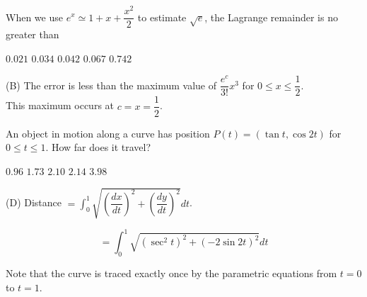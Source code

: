 \question
When we use $e^{x} \simeq 1+x+\dfrac{x^{2}}{2}$ to estimate $\sqrt{e}$, the Lagrange remainder is no greater than
\begin{choices}
  \choice $0.021$
  \choice $0.034$
  \choice $0.042$
  \choice $0.067$
  \choice $0.742$
\end{choices}
\begin{solution}
(B) The error is less than the maximum value of $\dfrac{e^{c}}{3!} x^{3}$ for $0 \leq x \leq \dfrac{1}{2}$.\\
This maximum occurs at $c=x=\dfrac{1}{2}$.
\end{solution}





\newpage






\question
An object in motion along a curve has position $P(t)=(\tan t, \cos 2 t)$ for $0 \leqslant t \leqslant 1$. How far does it travel?
\begin{choices}
  \choice $0.96$
  \choice $1.73$
  \choice $2.10$
  \choice $2.14$
  \choice $3.98$
\end{choices}
\begin{solution}
(D) Distance $=\displaystyle\int_{0}^{1} \sqrt{\left(\dfrac{d x}{d t}\right)^{2}+\left(\dfrac{d y}{d t}\right)^{2}} d t$.

\[
=\displaystyle\int_{0}^{1} \sqrt{\left(\sec ^{2} t\right)^{2}+(-2 \sin 2 t)^{2}} d t
\]

Note that the curve is traced exactly once by the parametric equations from $t=0$ to $t=1$.
\end{solution}